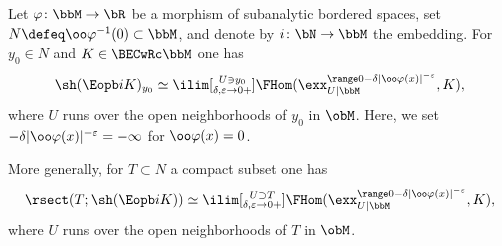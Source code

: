 \begin{proposition}\label{pro:sgerm}
Let $\varphi\colon \bbM\to \bR$ be a morphism of subanalytic bordered spaces, set
$N \defeq \oo\varphi{}^{-1}(0)\subset\bbM$, and denote by $i\colon \bN\to \bbM$ the embedding.
For $y_0\in N$ and $K\in\BECwRc \bbM$ one has
\[
\sh(\Eopb i K)_{y_0} \simeq
\ilim[\substack{U\owns y_0\\\delta,\varepsilon\to0+}]\FHom(\exx^{\range0{-\delta|\oo\varphi(x)|^{-\varepsilon}}}_{U|\bbM},K),
\]
where $U$ runs over the open neighborhoods of $y_0$ in $\obM$.
Here, we set $-\delta|\oo\varphi(x)|^{-\varepsilon}=-\infty$ for $\oo\varphi(x)=0$.

More generally, for $T\subset N$ a compact subset one has
\begin{equation}
\label{eq:sectT}
\rsect(T;\sh(\Eopb i K)) \simeq
\ilim[\substack{U\supset T\\\delta,\varepsilon\to0+}]\FHom(\exx^{\range0{-\delta|\oo\varphi(x)|^{-\varepsilon}}}_{U|\bbM},K),
\end{equation}
where $U$ runs over the open neighborhoods of $T$ in $\obM$.
\end{proposition}

